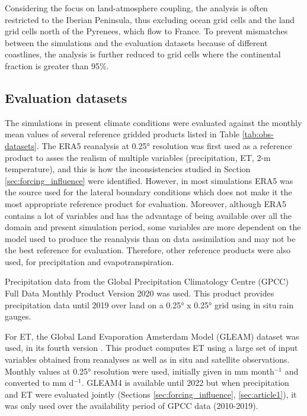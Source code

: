 Considering the focus on land-atmosphere coupling, the analysis is often restricted to the Iberian Peninsula, thus excluding ocean grid cells and the land grid cells north of the Pyrenees, which flow to France. To prevent mismatches between the simulations and the evaluation datasets because of different coastlines, the analysis is further reduced to grid cells where the continental fraction is greater than 95\%. 

\subsection{Evaluation datasets}

The simulations in present climate conditions were evaluated against the monthly mean values of several reference gridded products listed in Table \ref{tab:obs-datasets}.
The ERA5 reanalysis \citep{hersbach_era5_2020} at 0.25° resolution was first used as a reference product to asses the realism of multiple variables (precipitation, ET, 2-m temperature), and this is how the inconsistencies studied in Section \ref{sec:forcing_influence} were identified. However, in most simulations ERA5 was the source used for the lateral boundary conditions which does not make it the most appropriate reference product for evaluation. Moreover, although ERA5 contains a lot of variables and has the advantage of being available over all the domain and present simulation period, some variables are more dependent on the model used to produce the reanalysis than on data assimilation and may not be the best reference for evaluation. Therefore, other reference products were also used, for precipitation and evapotranspiration.

Precipitation data from the Global Precipitation Climatology Centre (GPCC) Full Data Monthly Product Version 2020 \citep{gpcc_v2020} was used. This product provides precipitation data until 2019 over land on a 0.25° x 0.25° grid using in situ rain gauges. 

For ET, the Global Land Evaporation Amsterdam Model (GLEAM) dataset was used, in its fourth version \citep{miralles_gleam4_2025}. This product computes ET using a large set of input variables obtained from reanalyses as well as in situ and satellite observations. Monthly values at 0.25° resolution were used, initially given in mm month$^{-1}$ and converted to mm d$^{-1}$. GLEAM4 is available until 2022 but when precipitation and ET were evaluated jointly (Sections \ref{sec:forcing_influence}, \ref{sec:article1}), it was only used over the availability period of GPCC data (2010-2019).

